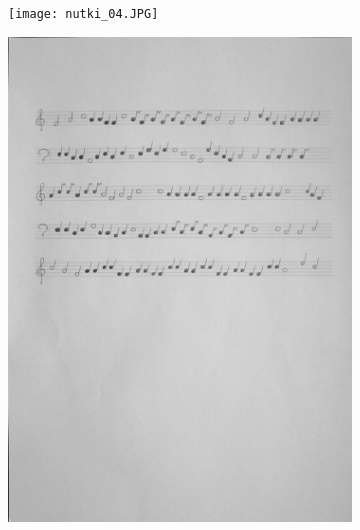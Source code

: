 \documentclass[11pt]{article}
\begin{document}
\begin{figure}
    \centering
    \begin{subfigure}{.5\textwidth}
        \centering
        \graphicspath{ {Resources/} }
        \texttt{[image: nutki\_04.JPG]}
        \label{fig:sub1}
    \end{subfigure}%
    \begin{subfigure}{.5\textwidth}
        \centering
        \graphicspath{ {output/} }
        \includegraphics[width=.9\linewidth]{warped4_gray.jpg}
        \label{fig:sub2}
    \end{subfigure}
    \label{fig:test}
\end{figure}
\end{document}
